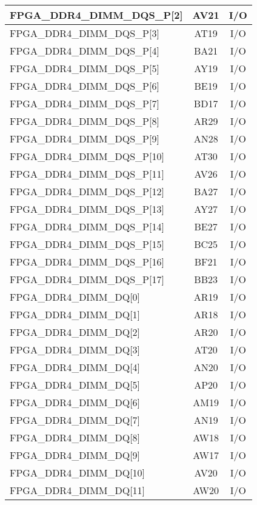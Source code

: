 \begin{longtable}[l]{| l | c | c |}
  FPGA\_DDR4\_DIMM\_DQS\_P[2]  & AV21 & I/O \\ \hline
  FPGA\_DDR4\_DIMM\_DQS\_P[3]  & AT19 & I/O \\ \hline
  FPGA\_DDR4\_DIMM\_DQS\_P[4]  & BA21 & I/O \\ \hline
  FPGA\_DDR4\_DIMM\_DQS\_P[5]  & AY19 & I/O \\ \hline
  FPGA\_DDR4\_DIMM\_DQS\_P[6]  & BE19 & I/O \\ \hline
  FPGA\_DDR4\_DIMM\_DQS\_P[7]  & BD17 & I/O \\ \hline
  FPGA\_DDR4\_DIMM\_DQS\_P[8]  & AR29 & I/O \\ \hline
  FPGA\_DDR4\_DIMM\_DQS\_P[9]  & AN28 & I/O \\ \hline
  FPGA\_DDR4\_DIMM\_DQS\_P[10] & AT30 & I/O \\ \hline
  FPGA\_DDR4\_DIMM\_DQS\_P[11] & AV26 & I/O \\ \hline
  FPGA\_DDR4\_DIMM\_DQS\_P[12] & BA27 & I/O \\ \hline
  FPGA\_DDR4\_DIMM\_DQS\_P[13] & AY27 & I/O \\ \hline
  FPGA\_DDR4\_DIMM\_DQS\_P[14] & BE27 & I/O \\ \hline
  FPGA\_DDR4\_DIMM\_DQS\_P[15] & BC25 & I/O \\ \hline
  FPGA\_DDR4\_DIMM\_DQS\_P[16] & BF21 & I/O \\ \hline
  FPGA\_DDR4\_DIMM\_DQS\_P[17] & BB23 & I/O \\ \hline
  FPGA\_DDR4\_DIMM\_DQ[0]      & AR19 & I/O \\ \hline
  FPGA\_DDR4\_DIMM\_DQ[1]      & AR18 & I/O \\ \hline
  FPGA\_DDR4\_DIMM\_DQ[2]      & AR20 & I/O \\ \hline
  FPGA\_DDR4\_DIMM\_DQ[3]      & AT20 & I/O \\ \hline
  FPGA\_DDR4\_DIMM\_DQ[4]      & AN20 & I/O \\ \hline
  FPGA\_DDR4\_DIMM\_DQ[5]      & AP20 & I/O \\ \hline
  FPGA\_DDR4\_DIMM\_DQ[6]      & AM19 & I/O \\ \hline
  FPGA\_DDR4\_DIMM\_DQ[7]      & AN19 & I/O \\ \hline
  FPGA\_DDR4\_DIMM\_DQ[8]      & AW18 & I/O \\ \hline
  FPGA\_DDR4\_DIMM\_DQ[9]      & AW17 & I/O \\ \hline
  FPGA\_DDR4\_DIMM\_DQ[10]     & AV20 & I/O \\ \hline
  FPGA\_DDR4\_DIMM\_DQ[11]     & AW20 & I/O \\ \hline

\end{longtable}
